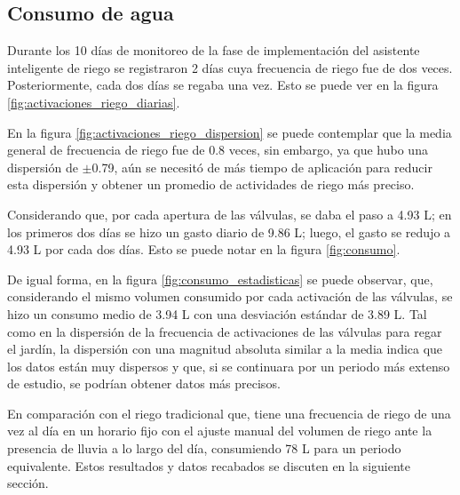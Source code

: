 \documentclass[pdflatex,sn-mathphys-num]{sn-jnl}%
\theoremstyle{thmstyleone}%
\theoremstyle{thmstyletwo}%
\theoremstyle{thmstylethree}%
\begin{document}
\begin{multicols}{2}
\justifying
\subsection*{Consumo de agua}
Durante los 10 días de monitoreo de la fase de implementación del asistente inteligente de riego se registraron 2 días cuya frecuencia de riego fue de dos veces. Posteriormente, cada dos días se regaba una vez. Esto se puede ver en la figura \ref{fig:activaciones_riego_diarias}.

En la figura \ref{fig:activaciones_riego_dispersion} se puede contemplar que la media general de frecuencia de riego fue de 0.8 veces, sin embargo, ya que hubo una dispersión de $\pm$0.79, aún se necesitó de más tiempo de aplicación para reducir esta dispersión y obtener un promedio de actividades de riego más preciso.

Considerando que, por cada apertura de las válvulas, se daba el paso a 4.93 L; en los primeros dos días se hizo un gasto diario de 9.86 L; luego, el gasto se redujo a 4.93 L por cada dos días. Esto se puede notar en la figura \ref{fig:consumo}.

De igual forma, en la figura \ref{fig:consumo_estadisticas} se puede observar,  que, considerando el mismo volumen consumido por cada activación de las válvulas, se hizo un consumo medio de 3.94 L con una desviación estándar de 3.89 L. Tal como en la dispersión de la frecuencia de activaciones de las válvulas para regar el jardín, la dispersión con una magnitud absoluta similar a la media indica que los datos están muy dispersos y que, si se continuara por un periodo más extenso de estudio, se podrían obtener datos más precisos. 

En comparación con el riego tradicional que, tiene una frecuencia de riego de una vez al día en un horario fijo con el ajuste manual del volumen de riego ante la presencia de lluvia a lo largo del día, consumiendo 78 L para un periodo equivalente. Estos resultados y datos recabados se discuten en la siguiente sección.
\end{multicols}
\end{document}
